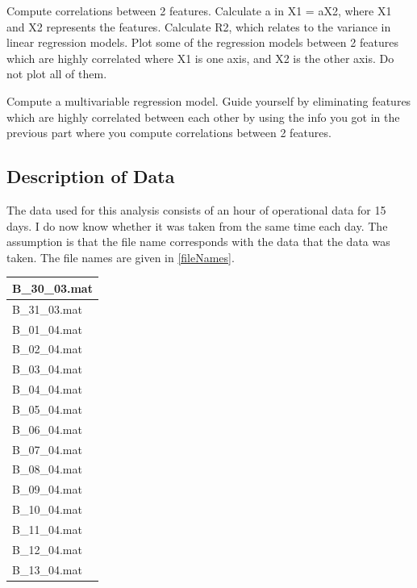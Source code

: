 \documentclass{article}
\begin{document}
Compute correlations between 2 features.
Calculate a in X1 = aX2, where X1 and X2 represents the features.
Calculate R2, which relates to the variance in linear regression models.
Plot some of the regression models between 2 features which are highly correlated where X1 is one axis, and X2 is the other axis. Do not plot all of them.

Compute a multivariable regression model.
Guide yourself by eliminating features which are highly correlated between each other by using the info you got in the previous part where you compute correlations between 2 features.

\subsection{Description of Data}
The data used for this analysis consists of an hour of operational data for 15 days. I do now know whether it was taken from the same time each day. The assumption is that the file name corresponds with the data that the data was taken.
The file names are given in \ref{fileNames}.
\begin{center}
\begin{tabular}{ |l| } 
 \hline
 B\_30\_03.mat \\
 \hline 
 B\_31\_03.mat \\
 \hline 
 B\_01\_04.mat \\
 \hline 
 B\_02\_04.mat \\
 \hline
 B\_03\_04.mat \\
 \hline 
 B\_04\_04.mat \\
 \hline 
 B\_05\_04.mat \\
 \hline
 B\_06\_04.mat \\
 \hline 
 B\_07\_04.mat \\
 \hline 
 B\_08\_04.mat \\
 \hline 
 B\_09\_04.mat \\
 \hline 
 B\_10\_04.mat \\
 \hline
 B\_11\_04.mat \\
 \hline 
 B\_12\_04.mat \\
 \hline
 B\_13\_04.mat \\
 \hline
\end{tabular}
\label{fileNames}
\end{center}
\end{document}
